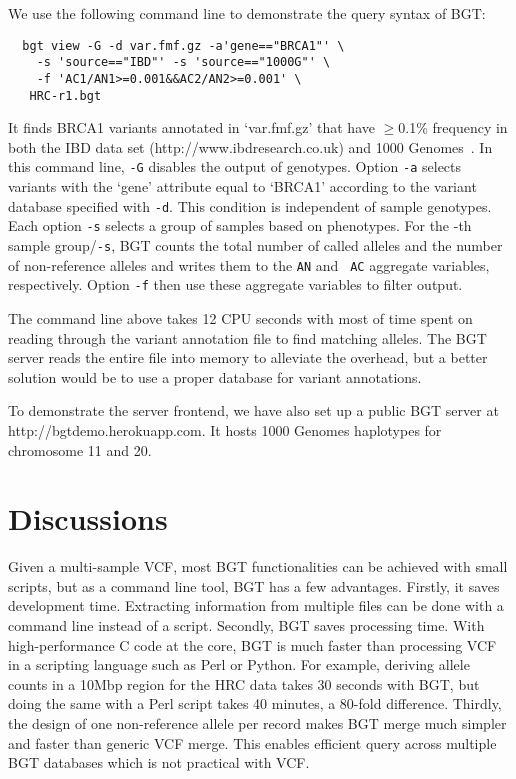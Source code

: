 \documentclass{bioinfo}
\begin{document}
We use the following command line to demonstrate the query syntax of BGT:
\begin{center}\footnotesize
\begin{verbatim}
  bgt view -G -d var.fmf.gz -a'gene=="BRCA1"' \
    -s 'source=="IBD"' -s 'source=="1000G"' \
    -f 'AC1/AN1>=0.001&&AC2/AN2>=0.001' \
   HRC-r1.bgt
\end{verbatim}
\end{center}
It finds BRCA1 variants annotated in `var.fmf.gz' that have $\ge$0.1\%
frequency in both the IBD data set (http://www.ibdresearch.co.uk) and
1000 Genomes~\citep{1000-Genomes-Project-Consortium:2012aa}. In this command line, {\tt -G} disables the output of genotypes.
Option {\tt -a} selects variants with the `gene' attribute equal to `BRCA1'
according to the variant database specified with {\tt -d}. This condition
is independent of sample genotypes. Each option {\tt -s} selects a group of
samples based on phenotypes.  For the -th sample
group/{\tt -s}, BGT counts the total number of called alleles and the number of
non-reference alleles and writes them to the {\tt AN\char35} and {\tt
AC\char35} aggregate variables, respectively. Option {\tt -f} then use these
aggregate variables to filter output.

The command line above takes 12 CPU seconds with most of time spent on reading
through the variant annotation file to find matching alleles. The BGT server
reads the entire file into memory to alleviate the overhead, but a better
solution would be to use a proper database for variant annotations.

To demonstrate the server frontend, we have also set up a public BGT server at
http://bgtdemo.herokuapp.com. It hosts 1000 Genomes haplotypes for chromosome 11 and
20.

\section{Discussions}

Given a multi-sample VCF, most BGT functionalities can be achieved with small
scripts, but as a command line tool, BGT has a few advantages. Firstly, it
saves development time. Extracting information from multiple files can be done
with a command line instead of a script.  Secondly,
BGT saves processing time. With high-performance C code at the core, BGT is
much faster than processing VCF in a scripting language such as Perl or Python.
For example, deriving allele counts in a 10Mbp region for the HRC data takes 30
seconds with BGT, but doing the same with a Perl script takes 40 minutes, a
80-fold difference. Thirdly, the design of one non-reference allele per record
makes BGT merge much simpler and faster than generic VCF merge. This enables
efficient query across multiple BGT databases which is not practical with VCF.
\end{document}
